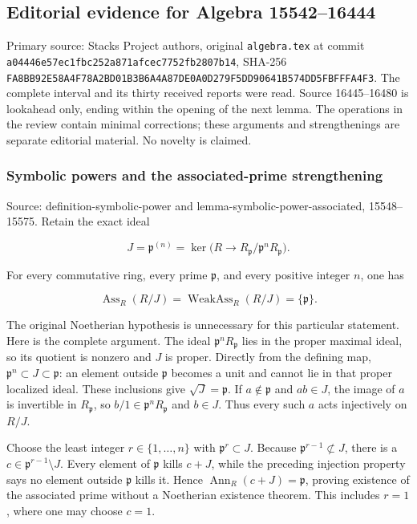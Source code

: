 \subsection{Editorial evidence for Algebra 15542--16444}\label{algebra-proof-005-editorial-evidence-for-algebra-1554216444}

Primary source: Stacks Project authors, original \texttt{algebra.tex} at commit \texttt{a04446e57ec1fbc252a871afcec7752fb2807b14}, SHA-256 \texttt{FA8BB92E58A4F78A2BD01B3B6A4A87DE0A0D279F5DD90641B574DD5FBFFFA4F3}. The complete interval and its thirty received reports were read. Source 16445--16480 is lookahead only, ending within the opening of the next lemma. The operations in the review contain minimal corrections; these arguments and strengthenings are separate editorial material. No novelty is claimed.

\subsubsection{Symbolic powers and the associated-prime strengthening}\label{algebra-proof-005-symbolic-powers-and-the-associated-prime-strengthening}

Source: definition-symbolic-power and lemma-symbolic-power-associated, 15548--15575. Retain the exact ideal

\[
J=\mathfrak p^{(n)}=\ker\bigl(R\longrightarrow R_{\mathfrak p}/\mathfrak p^nR_{\mathfrak p}\bigr).
\]

For every commutative ring, every prime \(\mathfrak p\), and every positive integer \(n\), one has

\[
\operatorname{Ass}_R(R/J)=\operatorname{WeakAss}_R(R/J)=\{\mathfrak p\}.
\]

The original Noetherian hypothesis is unnecessary for this particular statement. Here is the complete argument. The ideal \(\mathfrak p^nR_{\mathfrak p}\) lies in the proper maximal ideal, so its quotient is nonzero and \(J\) is proper. Directly from the defining map, \(\mathfrak p^n\subset J\subset\mathfrak p\): an element outside \(\mathfrak p\) becomes a unit and cannot lie in that proper localized ideal. These inclusions give \(\sqrt J=\mathfrak p\). If \(a\notin\mathfrak p\) and \(ab\in J\), the image of \(a\) is invertible in \(R_{\mathfrak p}\), so \(b/1\in\mathfrak p^nR_{\mathfrak p}\) and \(b\in J\). Thus every such \(a\) acts injectively on \(R/J\).

Choose the least integer \(r\in\{1,\ldots,n\}\) with \(\mathfrak p^r\subset J\). Because \(\mathfrak p^{r-1}\not\subset J\), there is a \(c\in\mathfrak p^{r-1}\setminus J\). Every element of \(\mathfrak p\) kills \(c+J\), while the preceding injection property says no element outside \(\mathfrak p\) kills it. Hence \(\operatorname{Ann}_R(c+J)=\mathfrak p\), proving existence of the associated prime without a Noetherian existence theorem. This includes \(r=1\), where one may choose \(c=1\).

